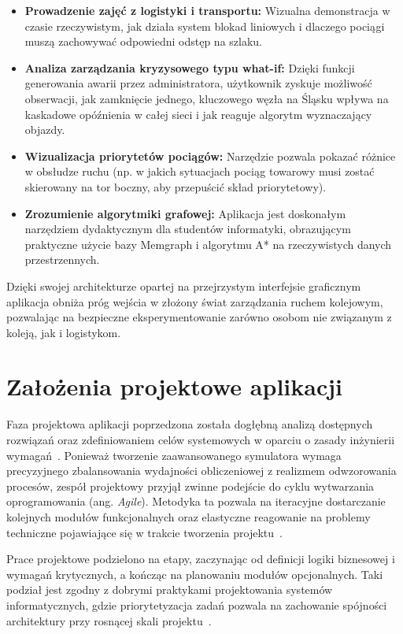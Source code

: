 \documentclass[twoside]{projektInzynierskiMS1z}
\begin{document}
\begin{itemize}
\item \textbf{Prowadzenie zajęć z logistyki i transportu:} Wizualna demonstracja
w czasie rzeczywistym, jak działa system blokad liniowych i dlaczego pociągi muszą
zachowywać odpowiedni odstęp na szlaku.

\item \textbf{Analiza zarządzania kryzysowego typu what-if:} Dzięki funkcji
generowania awarii przez administratora, użytkownik zyskuje możliwość obserwacji,
jak zamknięcie jednego, kluczowego węzła na Śląsku wpływa na kaskadowe opóźnienia
w całej sieci i jak reaguje algorytm wyznaczający objazdy.

\item \textbf{Wizualizacja priorytetów pociągów:} Narzędzie pozwala pokazać różnice
w obsłudze ruchu (np. w jakich sytuacjach pociąg towarowy musi zostać skierowany na
tor boczny, aby przepuścić skład priorytetowy).

\item \textbf{Zrozumienie algorytmiki grafowej:} Aplikacja jest doskonałym narzędziem
dydaktycznym dla studentów informatyki, obrazującym praktyczne użycie bazy Memgraph
i algorytmu A* na rzeczywistych danych przestrzennych.
\end{itemize}

Dzięki swojej architekturze opartej na przejrzystym interfejsie graficznym aplikacja
obniża próg wejścia w złożony świat zarządzania ruchem kolejowym, pozwalając na
bezpieczne eksperymentowanie zarówno osobom nie związanym z koleją, jak i logistykom.

\section{Założenia projektowe aplikacji}

Faza projektowa aplikacji poprzedzona została dogłębną analizą dostępnych rozwiązań
oraz zdefiniowaniem celów systemowych w oparciu o zasady inżynierii
wymagań~\cite{sommerville2016}. Ponieważ tworzenie zaawansowanego symulatora wymaga
precyzyjnego zbalansowania wydajności obliczeniowej z realizmem odwzorowania procesów,
zespół projektowy przyjął zwinne podejście do cyklu wytwarzania oprogramowania
(ang. \emph{Agile}). Metodyka ta pozwala na iteracyjne dostarczanie kolejnych
modułów funkcjonalnych oraz elastyczne reagowanie na problemy techniczne pojawiające
się w trakcie tworzenia projektu~\cite{agilemanifesto}.

Prace projektowe podzielono na etapy, zaczynając od definicji logiki biznesowej
i wymagań krytycznych, a kończąc na planowaniu modułów opcjonalnych. Taki podział
jest zgodny z dobrymi praktykami projektowania systemów informatycznych, gdzie
priorytetyzacja zadań pozwala na zachowanie spójności architektury przy rosnącej
skali projektu~\cite{martin2017clean}.
\end{document}
